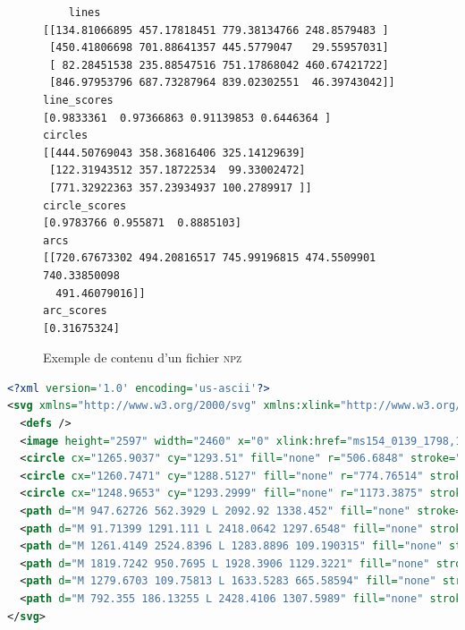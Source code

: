 \begin{figure}
\begin{center}
\begin{verbatim}
    lines
[[134.81066895 457.17818451 779.38134766 248.8579483 ]
 [450.41806698 701.88641357 445.5779047   29.55957031]
 [ 82.28451538 235.88547516 751.17868042 460.67421722]
 [846.97953796 687.73287964 839.02302551  46.39743042]]
line_scores
[0.9833361  0.97366863 0.91139853 0.6446364 ]
circles
[[444.50769043 358.36816406 325.14129639]
 [122.31943512 357.18722534  99.33002472]
 [771.32922363 357.23934937 100.2789917 ]]
circle_scores
[0.9783766 0.955871  0.8885103]
arcs
[[720.67673302 494.20816517 745.99196815 474.5509901  740.33850098
  491.46079016]]
arc_scores
[0.31675324]
\end{verbatim}
\end{center}
\caption{Exemple de contenu d'un fichier \textsc{npz}}
          \label{fig:npz}
          \end{figure}


\begin{lstlisting}[language=xml, frame=single, breaklines=true, caption={exemple de contenu d'un fichier \svg}]
<?xml version='1.0' encoding='us-ascii'?>
<svg xmlns="http://www.w3.org/2000/svg" xmlns:xlink="http://www.w3.org/1999/xlink" baseProfile="tiny" height="2597" version="1.2" width="2460" xmlns:inkscape="http://www.inkscape.org/namespaces/inkscape" xmlns:sodipodi="http://sodipodi.sourceforge.net/DTD/sodipodi-0.dtd" inkscape:version="1.3 (0e150ed, 2023-07-21)">
  <defs />
  <image height="2597" width="2460" x="0" xlink:href="ms154_0139_1798,1606,2460,2597.jpg" y="0" />
  <circle cx="1265.9037" cy="1293.51" fill="none" r="506.6848" stroke="orange" stroke-width="3" />
  <circle cx="1260.7471" cy="1288.5127" fill="none" r="774.76514" stroke="orange" stroke-width="3" />
  <circle cx="1248.9653" cy="1293.2999" fill="none" r="1173.3875" stroke="orange" stroke-width="3" />
  <path d="M 947.62726 562.3929 L 2092.92 1338.452" fill="none" stroke="green" stroke-width="3" />
  <path d="M 91.71399 1291.111 L 2418.0642 1297.6548" fill="none" stroke="green" stroke-width="3" />
  <path d="M 1261.4149 2524.8396 L 1283.8896 109.190315" fill="none" stroke="green" stroke-width="3" />
  <path d="M 1819.7242 950.7695 L 1928.3906 1129.3221" fill="none" stroke="green" stroke-width="3" />
  <path d="M 1279.6703 109.75813 L 1633.5283 665.58594" fill="none" stroke="green" stroke-width="3" />
  <path d="M 792.355 186.13255 L 2428.4106 1307.5989" fill="none" stroke="green" stroke-width="3" />
</svg>
\end{lstlisting}


